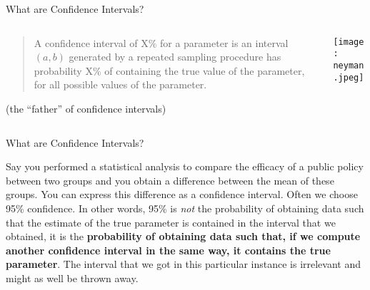 \begin{frame}{What are Confidence Intervals?
	}
	\begin{columns}
		\begin{column}{0.8\textwidth}
			\begin{defn}
				\begin{quotation}
					A confidence interval of X\% for a parameter is an interval $(a, b)$ generated by a repeated sampling procedure has probability X\% of containing the true value of the parameter, for all possible values of the parameter.
				\end{quotation}
				\vfill \vfill
				\textcite{neyman1937outline} (the ``father'' of confidence intervals)
			\end{defn}
		\end{column}
		\begin{column}{0.2\textwidth}
			\centering
			\texttt{[image: neyman.jpeg]}
		\end{column}
	\end{columns}
\end{frame}

\begin{frame}{What are Confidence Intervals?}
	\begin{example}
		Say you performed a statistical analysis to compare
		the efficacy of a public policy between two groups and you obtain a
		difference between the mean of these groups.
		You can express this difference as a confidence interval.
		Often we choose 95\% confidence.
		In other words, 95\% is \textit{not} the probability of obtaining data such that the estimate of the true parameter is contained in the interval that we obtained, it is the \textbf{probability of obtaining data such that, if we compute another confidence interval in the same way, it contains the true parameter}.
		The interval that we got in this particular instance is irrelevant and might as well be thrown away.
	\end{example}
\end{frame}

